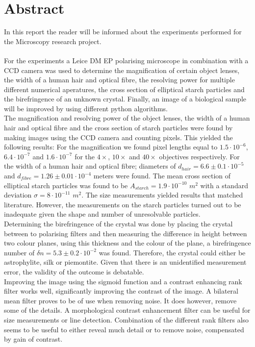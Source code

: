 \section*{Abstract}
In this report the reader will be informed about the experiments performed for the Microscopy research project.\\
\\
For the experiments a Leice DM EP polarising microscope in combination with a CCD camera was used to determine the magnification of certain object lenses, the width of a human hair and optical fibre, the resolving power for multiple different numerical aperatures, the cross section of elliptical starch particles and the birefringence of an unknown crystal. Finally, an image of a biological sample will be improved by using different python algorithms.\\
The magnification and resolving power of the object lenses, the width of a human hair and optical fibre and the cross section of starch particles were found by making images using the CCD camera and counting pixels. This yielded the following results: For the magnification we found pixel lengths equal to $1.5\cdot10^{-6}$, $6.4\cdot10^{-7}$ and $1.6\cdot10^{-7}$ for the $4\times$, $10\times$ and $40\times$ objectives respectively. For the width of a human hair and optical fibre; diameters of $d_{hair}=6.6\pm0.1\cdot10^{-5}$ and $d_{fibre} = 1.26\pm0.01\cdot10^{-4}$ meters were found. The mean cross section of elliptical starch particles was found to be $A_{starch}=1.9\cdot10^{-10}$ $m^2$ with a standard deviation $\sigma = 8 \cdot10^{-11}$ $m^2$. The size measurements yielded results that matched literature. However, the measurements on the starch particles turned out to be inadequate given the shape and number of unresolvable particles.\\
Determining the birefringence of the crystal was done by placing the crystal between to polarising filters and then measuring the difference in height between two colour planes, using this thickness and the colour of the plane, a birefringence number of $\delta n = 5.3\pm0.2\cdot10^{-2}$ was found. Therefore, the crystal could either be astrophylite, silk or piemontite. Given that there is an unidentified measurement error, the validity of the outcome is debatable.\\
Improving the image using the sigmoid function and a contrast enhancing rank filter works well, significantly improving the contrast of the image. A bilateral mean filter proves to be of use when removing noise. It does however, remove some of the details. A morphological contrast enhancement filter can be useful for size measurements or line detection. Combination of the different rank filters also seems to be useful to either reveal much detail or to remove noise, compensated by gain of contrast.

